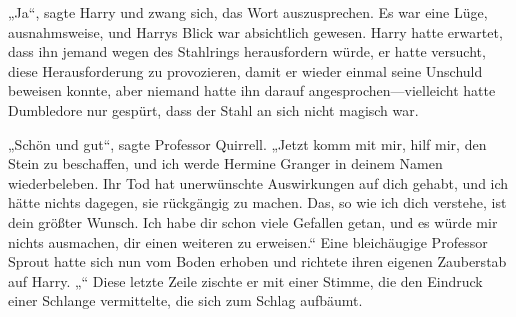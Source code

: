 „Ja“, sagte Harry und zwang sich, das Wort auszusprechen.
Es war eine Lüge, ausnahmsweise, und Harrys Blick war absichtlich gewesen. Harry hatte erwartet, dass ihn jemand wegen des Stahlrings herausfordern würde, er hatte versucht, diese Herausforderung zu provozieren, damit er wieder einmal seine Unschuld beweisen konnte, aber niemand hatte ihn darauf angesprochen—vielleicht hatte Dumbledore nur gespürt, dass der Stahl an sich nicht magisch war.

„Schön und gut“, sagte Professor Quirrell. „Jetzt komm mit mir, hilf mir, den Stein zu beschaffen, und ich werde Hermine Granger in deinem Namen wiederbeleben. Ihr Tod hat unerwünschte Auswirkungen auf dich gehabt, und ich hätte nichts dagegen, sie rückgängig zu machen. Das, so wie ich dich verstehe, ist dein größter Wunsch. Ich habe dir schon viele Gefallen getan, und es würde mir nichts ausmachen, dir einen weiteren zu erweisen.“
Eine bleichäugige Professor Sprout hatte sich nun vom Boden erhoben und richtete ihren eigenen Zauberstab auf Harry.
„“
Diese letzte Zeile zischte er mit einer Stimme, die den Eindruck einer Schlange vermittelte, die sich zum Schlag aufbäumt.

